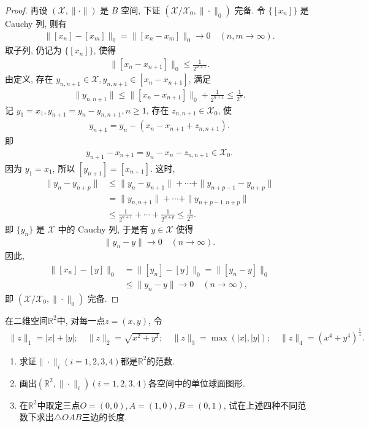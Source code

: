 \documentclass[../../main.tex]{subfiles}%
\begin{document}
\begin{proof}
再设 $(\mathscr{X},\|\cdot\|)$ 是 $B$ 空间, 下证 $(\mathscr{X}/\mathscr{X}_0,\|\cdot\|_0)$ 完备. 令 $\{[x_n]\}$ 是 Cauchy 列, 则有
\begin{align*}
\|[x_n] - [x_m]\|_0 = \|[x_n - x_m]\|_0 \to 0 \quad (n,m \to \infty).
\end{align*}
取子列, 仍记为 $\{[x_n]\}$, 使得
\begin{align*}
\|[x_n - x_{n+1}]\|_0 \leqslant \frac{1}{2^{n+1}}.
\end{align*}
由定义, 存在 $y_{n,n+1} \in \mathscr{X}, y_{n,n+1} \in [x_n - x_{n+1}]$, 满足
\begin{align*}
\|y_{n,n+1}\| \leqslant \|[x_n - x_{n+1}]\|_0 + \frac{1}{2^{n+1}} \leqslant \frac{1}{2^n}.
\end{align*}
记 $y_1 = x_1, y_{n+1} = y_n - y_{n,n+1}, n \geqslant 1$, 存在 $z_{n,n+1} \in \mathscr{X}_0$, 使
\begin{align*}
y_{n+1} = y_n - (x_n - x_{n+1} + z_{n,n+1}).
\end{align*}
即
\begin{align*}
y_{n+1} - x_{n+1} = y_n - x_n - z_{n,n+1} \in \mathscr{X}_0.
\end{align*}
因为 $y_1 = x_1$, 所以 $[y_{n+1}] = [x_{n+1}]$. 这时,
\begin{align*}
\|y_n - y_{n+p}\| &\leqslant \|y_n - y_{n+1}\| + \cdots + \|y_{n+p-1} - y_{n+p}\| \\
&= \|y_{n,n+1}\| + \cdots + \|y_{n+p-1,n+p}\| \\
&\leqslant \frac{1}{2^{n+1}} + \cdots + \frac{1}{2^{n+p}} \leqslant \frac{1}{2^n}.
\end{align*}
即 $\{y_n\}$ 是 $\mathscr{X}$ 中的 Cauchy 列, 于是有 $y \in \mathscr{X}$ 使得
\begin{align*}
\|y_n - y\| \to 0 \quad (n \to \infty).
\end{align*}
因此,
\begin{align*}
\|[x_n] - [y]\|_0 &= \|[y_n] - [y]\|_0 = \|[y_n - y]\|_0 \\
&\leqslant \|y_n - y\| \to 0 \quad (n \to \infty),
\end{align*}
即 $(\mathscr{X}/\mathscr{X}_0,\|\cdot\|_0)$ 完备.

\end{proof}

\begin{example}
在二维空间$\mathbb{R}^2$中, 对每一点$z = (x, y)$, 令
\begin{align*}
\|z\|_1 = |x| + |y|; \quad \|z\|_2 = \sqrt{x^2 + y^2}; \quad 
\|z\|_3 = \max(|x|, |y|); \quad \|z\|_4 = (x^4 + y^4)^{\frac{1}{4}}.
\end{align*}
\begin{enumerate}[(1)]
\item 求证$\|\cdot\|_i(i = 1, 2, 3, 4)$都是$\mathbb{R}^2$的范数.
\item 画出$(\mathbb{R}^2, \|\cdot\|_i)(i = 1, 2, 3, 4)$各空间中的单位球面图形.
\item 在$\mathbb{R}^2$中取定三点$O = (0, 0), A = (1, 0), B = (0, 1)$, 试在上述四种不同范数下求出$\triangle OAB$三边的长度.
\end{enumerate}
\end{example}
\end{document}
